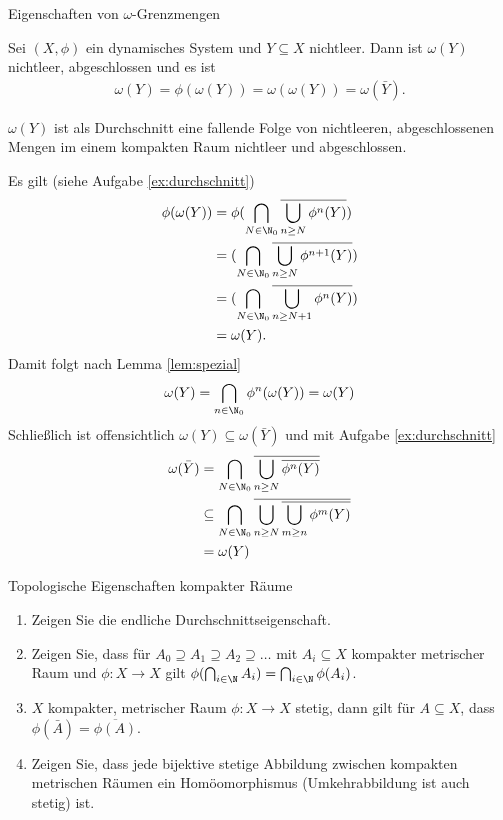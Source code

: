 \begin{satz}\label{th:omega} Eigenschaften von $\omega$-Grenzmengen

Sei $(X, \phi)$ ein dynamisches System und $Y \subseteq X$ nichtleer. Dann ist $\omega(Y)$ nichtleer, abgeschlossen und es ist 
\begin{align*}
  \omega(Y) = \phi(\omega (Y)) = \omega(\omega(Y)) = \omega(\bar Y).
\end{align*}
\end{satz}
\begin{beweis}
  $\omega(Y)$ ist als Durchschnitt eine fallende Folge von nichtleeren, abgeschlossenen Mengen im einem kompakten Raum nichtleer und abgeschlossen. 

Es gilt (siehe Aufgabe \ref{ex:durchschnitt})
\begin{align*}
  \phi(\omega(Y))&= \phi(\bigcap_{N \in \N_0} \overline{\bigcup_{n \geq N}\phi^n(Y)})\\
&=  (\bigcap_{N \in \N_0} \overline{\bigcup_{n \geq N}\phi^{n+1}(Y)})\\
&=  (\bigcap_{N \in \N_0} \overline{\bigcup_{n \geq N+1}\phi^{n}(Y)})\\
&= \omega(Y).
\end{align*}
Damit folgt nach Lemma \ref{lem:spezial}
\begin{align*}
  \omega(Y)= \bigcap_{n \in \N_0}\phi^n(\omega(Y)) = \omega(Y)
\end{align*}
Schließlich ist offensichtlich $\omega(Y) \subseteq \omega(\bar Y)$ und mit Aufgabe \ref{ex:durchschnitt}
\begin{align*}
  \omega(\bar Y) &= \bigcap_{N \in \N_0} \overline{\bigcup_{n \geq N}\overline{\phi^n(Y)}}\\
& \subseteq \bigcap_{N \in \N_0} \overline{\bigcup_{n \geq N}\overline{\bigcup_{m \geq n}\phi^m(Y)}}\\
&= \omega(Y)
\end{align*}
\end{beweis}
\begin{uebung}\label{ex:durchschnitt}Topologische Eigenschaften kompakter Räume
\renewcommand{\labelenumi}{(\alph{enumi})}
  \begin{enumerate}
  \item Zeigen Sie die endliche Durchschnittseigenschaft.
  \item Zeigen Sie, dass für $A_0 \supseteq A_1 \supseteq A_2 \supseteq \dots$ mit $A_i \subseteq X$ kompakter metrischer Raum und $\phi: X \to X$ gilt $\phi(\bigcap_{i \in \N} A_i) = \bigcap_{i \in \N} \phi(A_i)$.
  \item $X$ kompakter, metrischer Raum $\phi:X \to X$ stetig, dann gilt für $A \subseteq X$, dass $\phi(\bar A) = \overline{\phi(A)}$.
  \item Zeigen Sie, dass jede bijektive stetige Abbildung zwischen kompakten metrischen Räumen ein Homöomorphismus (Umkehrabbildung ist auch stetig) ist.
  \end{enumerate}
\end{uebung}

